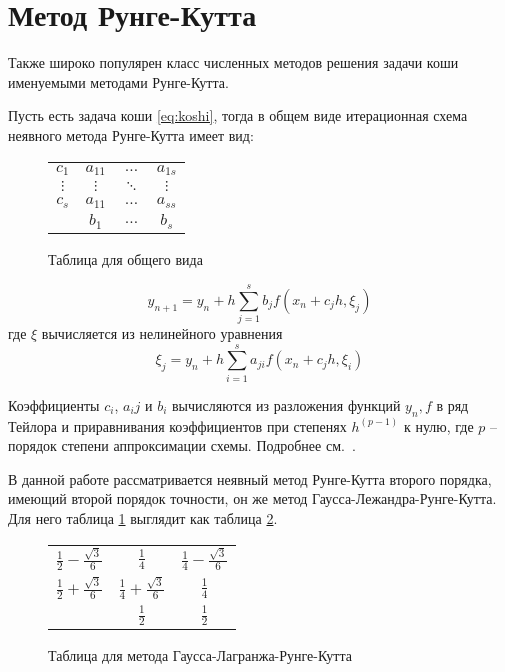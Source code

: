\section{Метод Рунге-Кутта}
Также широко популярен класс численных методов решения задачи коши именуемыми
методами Рунге-Кутта.

Пусть есть задача коши \ref{eq:koshi}, тогда
в общем виде итерационная схема неявного метода Рунге-Кутта имеет вид:
\begin{figure}[h]
    \renewcommand{\arraystretch}{1.2}
    \centering
    \begin{tabular}{c|ccc}
        $c_1$    & $a_{11}$ & $\ldots$ & $a_{1s}$ \\
        $\vdots$ & $\vdots$ & $\ddots$ & $\vdots$ \\
        $c_s$    & $a_{11}$ & $\ldots$ & $a_{ss}$ \\ \hline
                 & $b_{1}$  & $\ldots$ & $b_{s}$ \\
    \end{tabular}
    \caption{Таблица для общего вида}
\label{tab:tableau_basic}
\end{figure}

\begin{equation}\label{eq:rk-schema}
    y_{n+1} = y_n + h\sum_{j=1}^s b_j f(x_n+c_jh, \xi_j)
\end{equation}
где $\xi$ вычисляется из нелинейного уравнения
\begin{equation}\label{eq:rk-not-linear}
    \xi_j = y_n + h\sum_{i=1}^{s}a_{ji} f(x_n+c_jh, \xi_i)
\end{equation}

Коэффициенты $c_i$, $a_ij$ и $b_i$ вычисляются из разложения функций $y_n,
f$ в ряд Тейлора и приравнивания коэффициентов при степенях $h^{(p-1)}$ к нулю,
где $p$ -- порядок степени аппроксимации схемы. Подробнее
см.~\cite[стр. 75]{chilsl-metodi}.

В данной работе рассматривается неявный метод Рунге-Кутта
второго порядка, имеющий второй порядок точности,
он же метод Гаусса-Лежандра-Рунге-Кутта. Для него
таблица \ref{tab:tableau_basic} выглядит как таблица \ref{tab:gauss-lagr}.

\begin{figure}[h]
    \renewcommand{\arraystretch}{1.8}
    \centering
    \begin{tabular}{c|cc}
        $\frac12 - \frac{\sqrt3}6$ & $\frac14$                  & $\frac14 - \frac{\sqrt3}6$ \\
        $\frac12 + \frac{\sqrt3}6$ & $\frac14 + \frac{\sqrt3}6$ & $\frac14$ \\ \hline
                                   & $\frac12$                  & $\frac12$
    \end{tabular}
    \caption{Таблица для метода Гаусса-Лагранжа-Рунге-Кутта}
\label{tab:gauss-lagr}
\end{figure}


